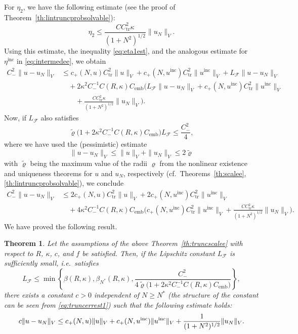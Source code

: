 \documentclass[12pt,DIV=14]{scrartcl}
\newtheorem{theorem}[definition]{Theorem}
\begin{document}
For $\eta_2$, we have the following estimate (see the proof of Theorem~\ref{th:lintruncprobsolvable}):
\[
\eta_2 \le \frac{CC_\mathrm{tr}^2\kappa}{(1+N^2)^{1/2}} \|u_N\|_V.
\]
Using this estimate, the inequality \eqref{eq:eta1est}, and the analogous estimate for $\eta^\mathrm{inc}$
in \eqref{eq:intermedee}, we obtain
\begin{align*}
C_-^2 \|u-u_N\|_V
&\le c_+(N,u) C_\mathrm{tr}^2 \|u\|_V
+ c_+(N,u^\mathrm{inc}) C_\mathrm{tr}^2 \|u^\mathrm{inc}\|_V
+ L_\mathcal{F} \|u-u_N\|_V\\
&\quad
+ 2\kappa^2 C_-^{-1}C(R,\kappa) C_\mathrm{emb}
\Big(L_\mathcal{F} \|u-u_N\|_V
+ c_+(N,u^\mathrm{inc}) C_\mathrm{tr}^2 \|u^\mathrm{inc}\|_V\\
&\qquad
+ \frac{CC_\mathrm{tr}^2\kappa}{(1+N^2)^{1/2}} \|u_N\|_V\Big).
\end{align*}
Now, if $L_\mathcal{F}$ also satisfies
\[
\tilde{\varrho}\big(1+2\kappa^2 C_-^{-1}C(R,\kappa) C_\mathrm{emb}\big) L_\mathcal{F}\le \frac{C_-^2}{4},
\]
where we have used the (pessimistic) estimate
\[
\|u-u_N\|_V \le \|u\|_V + \|u_N\|_V
\le 2\tilde{\varrho}
\]
with $\tilde{\varrho}$ being the maximum value of the radii $\varrho$ from
the nonlinear existence and uniqueness theorems for $u$ and $u_N$, respectively
(cf.~Theorems~\ref{th:scalee}, \ref{th:lintruncprobsolvable}),
we conclude
\begin{equation}\label{eq:truncerrest1}
\begin{aligned}
C_-^2 \|u-u_N\|_V
&\le 2c_+(N,u) C_\mathrm{tr}^2 \|u\|_V
+ 2c_+(N,u^\mathrm{inc}) C_\mathrm{tr}^2 \|u^\mathrm{inc}\|_V\\
&\quad
+ 4\kappa^2 C_-^{-1}C(R,\kappa) C_\mathrm{emb}
\Big(c_+(N,u^\mathrm{inc}) C_\mathrm{tr}^2 \|u^\mathrm{inc}\|_V
+ \frac{CC_\mathrm{tr}^2\kappa}{(1+N^2)^{1/2}} \|u_N\|_V\Big).
\end{aligned}
\end{equation}
We have proved the following result.
\begin{theorem}\label{th:truncscalerrest}
Let the assumptions of the above Theorem~\ref{th:truncscalee}
with respect to $R$, $\kappa$, $c$, and $f$ be satisfied.
Then, if the Lipschitz constant $L_\mathcal{F}$ is sufficiently small,
i.e.\ satisfies
\[
L_\mathcal{F}\le\min\left\{\beta(R,\kappa),\beta_{N^\ast}(R,\kappa),
\frac{C_-^2}{4\tilde{\varrho}\big(1+2\kappa^2 C_-^{-1}C(R,\kappa) C_\mathrm{emb}\big)}
\right\},
\]
there exists a constant $c>0$ independent of $N\ge N^\ast$
(the structure of the constant can be seen from \eqref{eq:truncerrest1})
such that the following estimate holds:
\[
c\|u-u_N\|_V
\le c_+(N,u) \|u\|_V
+ c_+(N,u^\mathrm{inc}) \|u^\mathrm{inc}\|_V\\
+ \frac{1}{(1+N^2)^{1/2}} \|u_N\|_V.
\]
\end{theorem}
\end{document}
